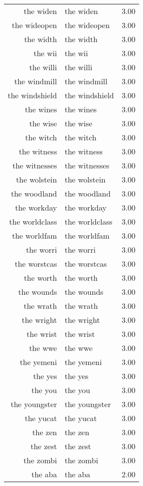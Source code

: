 \begin{table}[ht]
\begin{tabular}{rlr}
  the widen & the widen & 3.00 \\ 
  the wideopen & the wideopen & 3.00 \\ 
  the width & the width & 3.00 \\ 
  the wii & the wii & 3.00 \\ 
  the willi & the willi & 3.00 \\ 
  the windmill & the windmill & 3.00 \\ 
  the windshield & the windshield & 3.00 \\ 
  the wines & the wines & 3.00 \\ 
  the wise & the wise & 3.00 \\ 
  the witch & the witch & 3.00 \\ 
  the witness & the witness & 3.00 \\ 
  the witnesses & the witnesses & 3.00 \\ 
  the wolstein & the wolstein & 3.00 \\ 
  the woodland & the woodland & 3.00 \\ 
  the workday & the workday & 3.00 \\ 
  the worldclass & the worldclass & 3.00 \\ 
  the worldfam & the worldfam & 3.00 \\ 
  the worri & the worri & 3.00 \\ 
  the worstcas & the worstcas & 3.00 \\ 
  the worth & the worth & 3.00 \\ 
  the wounds & the wounds & 3.00 \\ 
  the wrath & the wrath & 3.00 \\ 
  the wright & the wright & 3.00 \\ 
  the wrist & the wrist & 3.00 \\ 
  the wwe & the wwe & 3.00 \\ 
  the yemeni & the yemeni & 3.00 \\ 
  the yes & the yes & 3.00 \\ 
  the you & the you & 3.00 \\ 
  the youngster & the youngster & 3.00 \\ 
  the yucat & the yucat & 3.00 \\ 
  the zen & the zen & 3.00 \\ 
  the zest & the zest & 3.00 \\ 
  the zombi & the zombi & 3.00 \\ 
  the aba & the aba & 2.00 \\ 

\end{tabular}
\end{table}
